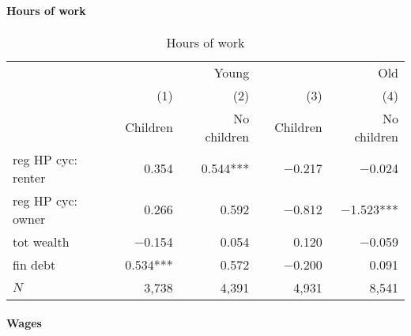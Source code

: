\documentclass[10pt]{article}
\theoremstyle{definition}
\theoremstyle{remark}
\begin{document}
\paragraph{Hours of work} 

\begin{table}[pt]
    \centering
    \caption{Hours of work}
    \label{tab:hours_of_work}
    \begin{tabular}{lrrlrr}
        \toprule
        & \multicolumn{2}{r}{Young} &  & \multicolumn{2}{r}{Old} \\
        \cmidrule{2-3} \cmidrule{5-6} 
        & (1) & (2) &  & (3) & (4) \\
        & Children & No children &  & Children & No children \\
        \midrule
        reg HP cyc: renter & 0.354\phantom{***} & 0.544*** &  & $-$0.217\phantom{***} & $-$0.024\phantom{***} \\
        reg HP cyc: owner & 0.266\phantom{***} & 0.592\phantom{***} &  & $-$0.812\phantom{***} & $-$1.523*** \\
        tot wealth & $-$0.154\phantom{***} & 0.054\phantom{***} &  & 0.120\phantom{***} & $-$0.059\phantom{***} \\
        fin debt & 0.534*** & 0.572\phantom{***} &  & $-$0.200\phantom{***} & 0.091\phantom{***} \\
        \midrule
        $N$ & 3,738\phantom{***} & 4,391\phantom{***} &  & 4,931\phantom{***} & 8,541\phantom{***} \\
        \bottomrule
    \end{tabular}
\end{table}

\paragraph{Wages} 
\end{document}
